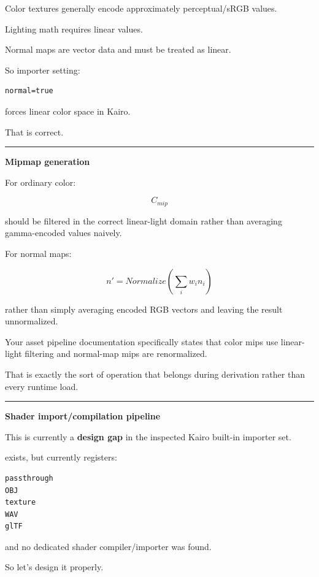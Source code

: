 Color textures generally encode approximately perceptual/sRGB values.

Lighting math requires linear values.

Normal maps are vector data and must be treated as linear.

So importer setting:

\begin{verbatim}
normal=true
\end{verbatim}

forces linear color space in Kairo.

That is correct.

\begin{center}\rule{0.5\linewidth}{0.5pt}\end{center}

\textbf{Mipmap generation}

For ordinary color:

\[
C_{mip}
\]

should be filtered in the correct linear-light domain rather than averaging gamma-encoded values naively.

For normal maps:

\[
n'=
Normalize\left(
\sum_i w_i n_i
\right)
\]

rather than simply averaging encoded RGB vectors and leaving the result unnormalized.

Your asset pipeline documentation specifically states that color mips use linear-light filtering and normal-map mips are renormalized.

That is exactly the sort of operation that belongs during derivation rather than every runtime load.

\begin{center}\rule{0.5\linewidth}{0.5pt}\end{center}

\textbf{Shader import/compilation pipeline}

This is currently a \textbf{design gap} in the inspected Kairo built-in importer set.

 exists, but  currently registers:

\begin{verbatim}
passthrough
OBJ
texture
WAV
glTF
\end{verbatim}

and no dedicated shader compiler/importer was found.

So let's design it properly.

